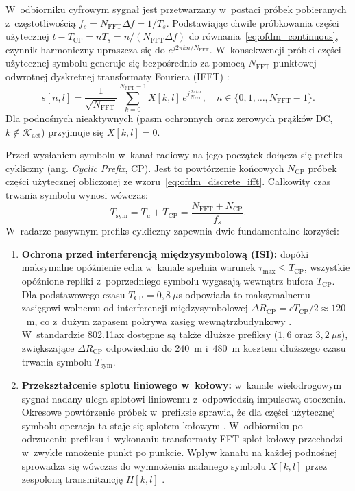 W~odbiorniku cyfrowym sygnał jest przetwarzany w~postaci próbek pobieranych z~częstotliwością $f_s = N_{\mathrm{FFT}}\Delta f = 1/T_s$. Podstawiając chwile próbkowania części użytecznej $t - T_{\mathrm{CP}} = n T_s = n / (N_{\mathrm{FFT}}\Delta f)$ do równania~\eqref{eq:ofdm_continuous}, czynnik harmoniczny upraszcza się do $e^{j 2\pi k n / N_{\mathrm{FFT}}}$. W~konsekwencji próbki części użytecznej symbolu generuje się bezpośrednio za pomocą $N_{\mathrm{FFT}}$-punktowej odwrotnej dyskretnej transformaty Fouriera (IFFT) \cite{zielinski2007}:
\begin{equation}
    s[n, l] = \frac{1}{\sqrt{N_{\mathrm{FFT}}}} \sum_{k=0}^{N_{\mathrm{FFT}}-1} X[k,l]\, e^{j \frac{2\pi k n}{N_{\mathrm{FFT}}}}, \quad n \in \{0, 1, \dots, N_{\mathrm{FFT}}-1\}.
    \label{eq:ofdm_discrete_ifft}
\end{equation}
Dla podnośnych nieaktywnych (pasm ochronnych oraz zerowych prążków DC, $k \notin \mathcal{K}_{\mathrm{act}}$) przyjmuje się $X[k,l] = 0$.

Przed wysłaniem symbolu w~kanał radiowy na jego początek dołącza się prefiks cykliczny (ang. \textit{Cyclic Prefix}, CP). Jest to powtórzenie końcowych $N_{\mathrm{CP}}$ próbek części użytecznej obliczonej ze wzoru~\eqref{eq:ofdm_discrete_ifft}. Całkowity czas trwania symbolu wynosi wówczas:
\begin{equation}
    T_{\mathrm{sym}} = T_u + T_{\mathrm{CP}} = \frac{N_{\mathrm{FFT}} + N_{\mathrm{CP}}}{f_s}.
    \label{eq:ofdm_symbol_duration}
\end{equation}
W~radarze pasywnym prefiks cykliczny zapewnia dwie fundamentalne korzyści:
\begin{enumerate}
    \item \textbf{Ochrona przed interferencją międzysymbolową (ISI):} dopóki maksymalne opóźnienie echa w~kanale spełnia warunek $\tau_{\max} \le T_{\mathrm{CP}}$, wszystkie opóźnione repliki z~poprzedniego symbolu wygasają wewnątrz bufora $T_{\mathrm{CP}}$. Dla podstawowego czasu $T_{\mathrm{CP}} = 0{,}8~\mu$s odpowiada to maksymalnemu zasięgowi wolnemu od interferencji międzysymbolowej $\Delta R_{\mathrm{CP}} = c T_{\mathrm{CP}} / 2 \approx 120$~m, co z~dużym zapasem pokrywa zasięg wewnątrzbudynkowy \cite{braun2014}. W~standardzie 802.11ax dostępne są także dłuższe prefiksy ($1{,}6$ oraz $3{,}2~\mu$s), zwiększające $\Delta R_{\mathrm{CP}}$ odpowiednio do 240~m i~480~m kosztem dłuższego czasu trwania symbolu $T_{\mathrm{sym}}$.
    \item \textbf{Przekształcenie splotu liniowego w~kołowy:} w~kanale wielodrogowym sygnał nadany ulega splotowi liniowemu z~odpowiedzią impulsową otoczenia. Okresowe powtórzenie próbek w~prefiksie sprawia, że dla części użytecznej symbolu operacja ta staje się splotem kołowym \cite{zielinski2007}. W~odbiorniku po odrzuceniu prefiksu i~wykonaniu transformaty FFT splot kołowy przechodzi w~zwykłe mnożenie punkt po punkcie. Wpływ kanału na każdej podnośnej sprowadza się wówczas do wymnożenia nadanego symbolu $X[k,l]$ przez zespoloną transmitancję $H[k,l]$ \cite{braun2014}.
\end{enumerate}

